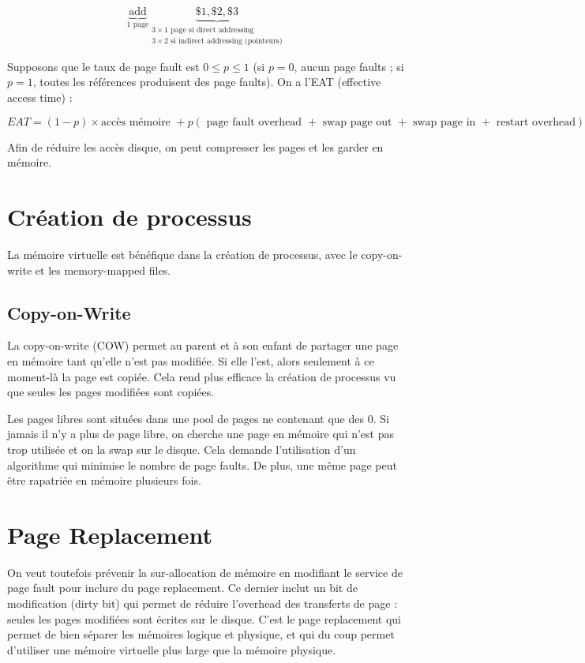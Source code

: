 	$$\underbrace{\text{add}}_{1\text{ page}} \underbrace{\$1, \$2, \$3}_{\substack{3 \times 1 \text{ page si direct addressing}\\3 \times 2 \text{ si indirect addressing (pointeurs)}}}$$
	
	
	
	Supposons que le taux de page fault est $0 \leq p \leq 1$ (si $p = 0$, aucun page faults ; si $p = 1$, toutes les références produisent des page faults). On a l'EAT (effective access time) :
	
	$$EAT = (1 - p) \times \text{accès mémoire } + p (\text{ page fault overhead } + \text{ swap page out } + \text{ swap page in } + \text{ restart overhead})$$
	
	Afin de réduire les accès disque, on peut compresser les pages et les garder en mémoire.
	
\section{Création de processus}

La mémoire virtuelle est bénéfique dans la création de processus, avec le copy-on-write et les memory-mapped files.

	\subsection{Copy-on-Write}
	
	La copy-on-write (COW) permet au parent et à son enfant de partager une page en mémoire tant qu'elle n'est pas modifiée. Si elle l'est, alors seulement à ce moment-là la page est copiée. Cela rend plus efficace la création de processus vu que seules les pages modifiées sont copiées.
	
	Les pages libres sont situées dans une pool de pages ne contenant que des 0. Si jamais il n'y a plus de page libre, on cherche une page en mémoire qui n'est pas trop utilisée et on la swap sur le disque. Cela demande l'utilisation d'un algorithme qui minimise le nombre de page faults. De plus, une même page peut être rapatriée en mémoire plusieurs fois.
	
	
\section{Page Replacement}
	
	On veut toutefois prévenir la sur-allocation de mémoire en modifiant le service de page fault pour inclure du page replacement. Ce dernier inclut un bit de modification (dirty bit) qui permet de réduire l'overhead des transferts de page : seules les pages modifiées sont écrites sur le disque. C'est le page replacement qui permet de bien séparer les mémoires logique et physique, et qui du coup permet d'utiliser une mémoire virtuelle plus large que la mémoire physique.
	
